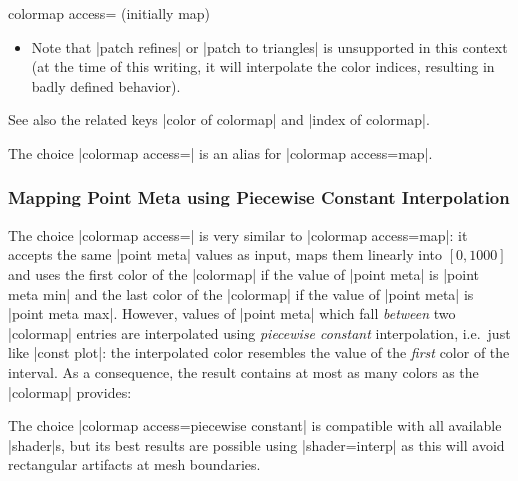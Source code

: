 \begin{pgfplotskey}{colormap access= (initially map)}
\begin{itemize}
		\item Note that |patch refines| or |patch to triangles| is unsupported in this context (at the time of this writing, it will interpolate the color indices, resulting in badly defined behavior).

	\end{itemize}

	See also the related keys |color of colormap| and |index of colormap|.

	
	The choice |colormap access=| is an alias for |colormap access=map|.

	\subsubsection{Mapping Point Meta using Piecewise Constant Interpolation}
	The choice |colormap access=| is very similar to |colormap access=map|: it accepts the same |point meta| values as input, maps them linearly into $[0,1000]$ and uses the first color of the |colormap| if the value of |point meta| is |point meta min| and the last color of the |colormap| if the value of |point meta| is |point meta max|. However, values of |point meta| which fall \emph{between} two |colormap| entries are interpolated using \emph{piecewise constant} interpolation, i.e.\ just like |const plot|: the interpolated color resembles the value of the \emph{first} color of the interval. As a consequence, the result contains at most  as many colors as the |colormap| provides:
\begin{codeexample}[]
\end{codeexample}
	The choice |colormap access=piecewise constant| is compatible with all available |shader|s, but its best results are possible using |shader=interp| as this will avoid rectangular artifacts at mesh boundaries.
\begin{codeexample}[]
\end{codeexample}


\end{pgfplotskey}
